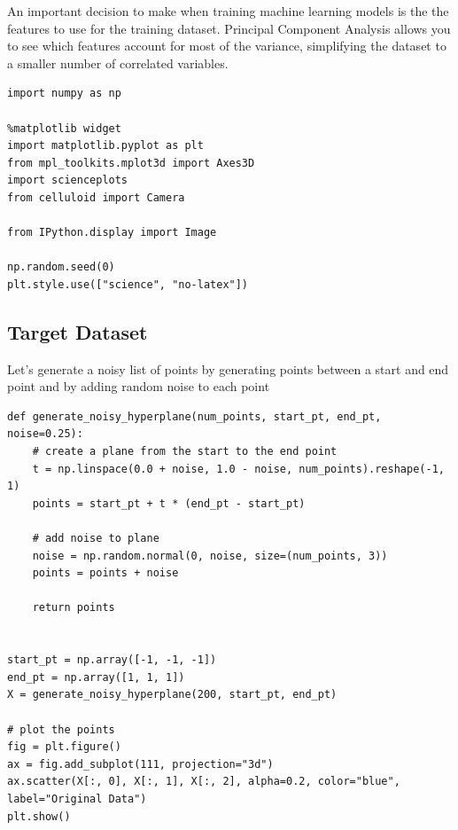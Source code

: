 \documentclass[openany]{book}
\begin{document}
An important decision to make when training machine learning models is
the the features to use for the training dataset. Principal Component
Analysis allows you to see which features account for most of the
variance, simplifying the dataset to a smaller number of correlated
variables.

\begin{tcolorbox}
\tiny
\begin{verbatim}
import numpy as np

%matplotlib widget
import matplotlib.pyplot as plt
from mpl_toolkits.mplot3d import Axes3D
import scienceplots
from celluloid import Camera

from IPython.display import Image

np.random.seed(0)
plt.style.use(["science", "no-latex"])
\end{verbatim}
\end{tcolorbox}

    \subsection{Target Dataset}\label{target-dataset}

Let's generate a noisy list of points by generating points between a
start and end point and by adding random noise to each point

\begin{tcolorbox}
\tiny
\begin{verbatim}
def generate_noisy_hyperplane(num_points, start_pt, end_pt, noise=0.25):
    # create a plane from the start to the end point
    t = np.linspace(0.0 + noise, 1.0 - noise, num_points).reshape(-1, 1)
    points = start_pt + t * (end_pt - start_pt)

    # add noise to plane
    noise = np.random.normal(0, noise, size=(num_points, 3))
    points = points + noise

    return points


start_pt = np.array([-1, -1, -1])
end_pt = np.array([1, 1, 1])
X = generate_noisy_hyperplane(200, start_pt, end_pt)

# plot the points
fig = plt.figure()
ax = fig.add_subplot(111, projection="3d")
ax.scatter(X[:, 0], X[:, 1], X[:, 2], alpha=0.2, color="blue", label="Original Data")
plt.show()
\end{verbatim}
\end{tcolorbox}
\end{document}
